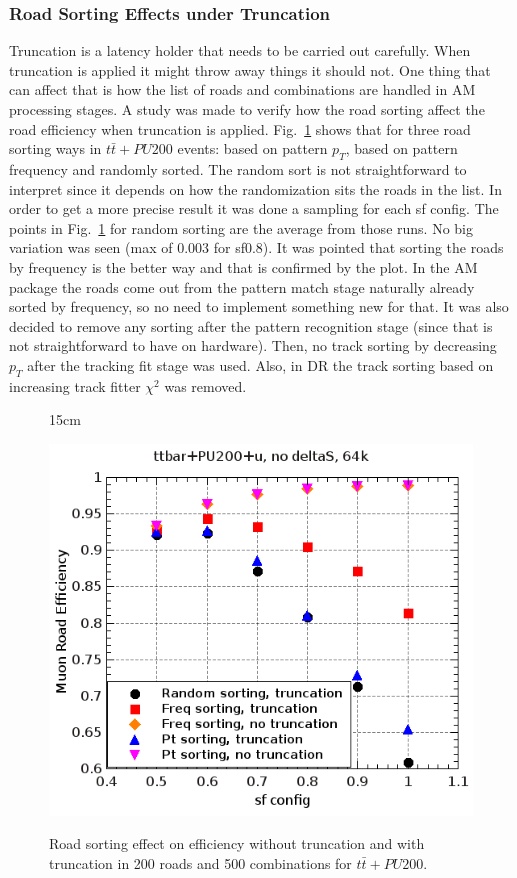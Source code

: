 \subsubsection{Road Sorting Effects under Truncation}
Truncation is a latency holder that needs to be carried out carefully. When truncation is applied it might throw away things it should not. One thing that can affect that is how the list of roads and combinations are handled in AM processing stages. A study was made to verify how the road sorting affect the road efficiency when truncation is applied. Fig.~\ref{fig:road_sorting} shows that for three road sorting ways in $t\bar{t}+PU200$ events: based on pattern $p_{T}$, based on pattern frequency and randomly sorted. The random sort is not straightforward to interpret since it depends on how the randomization sits the roads in the list. In order to get a more precise result it was done a sampling for each sf config. The points in Fig.~\ref{fig:road_sorting} for random sorting are the average from those runs. No big variation was seen (max of 0.003 for sf0.8). It was pointed that sorting the roads by frequency is the better way and that is confirmed by the plot. In the AM package the roads come out from the pattern match stage naturally already sorted by frequency, so no need to implement something new for that. It was also decided to remove any sorting after the pattern recognition stage (since that is not straightforward to have on hardware). Then, no track sorting by decreasing $p_{T}$ after the tracking fit stage was used. Also, in DR the track sorting based on increasing track fitter $\chi^{2}$ was removed.

\begin{figure}[htbp]{15cm}
	\caption{Road sorting effect on efficiency without truncation and with truncation in 200 roads and 500 combinations for $t\bar{t}+PU200$.}
	\centering
	\includegraphics[scale=0.6]{AppendixCMSL1TT/figs/ttbar_pu200_mu_road_sorting_comparison}
	\label{fig:road_sorting}	
\end{figure}


